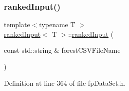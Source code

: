 \subsubsection{\texorpdfstring{ranked\+Input()}{rankedInput()}\hspace{0.1cm}{\footnotesize\ttfamily [2/2]}}
{\footnotesize\ttfamily template$<$typename T $>$ \\
\hyperlink{classrankedInput}{ranked\+Input}$<$ T $>$\+::\hyperlink{classrankedInput}{ranked\+Input} (\begin{DoxyParamCaption}\item[{const std\+::string \&}]{forest\+C\+S\+V\+File\+Name }\end{DoxyParamCaption})\hspace{0.3cm}{\ttfamily [inline]}}



Definition at line 364 of file fp\+Data\+Set.\+h.


